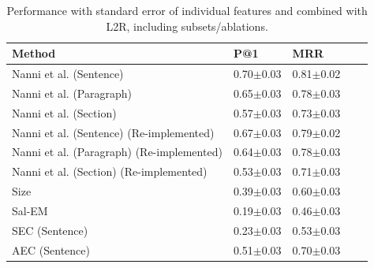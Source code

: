\begin{table}[t]
    \caption{Performance with standard error of individual features and combined with L2R, including subsets/ablations.}
    \label{tab:Results}
    \begin{tabular}{@{}lllll@{}}
        \toprule
        Method & 
       P@1 &
        MRR \\ 
        
        \midrule
        
         Nanni et al. (Sentence) \cite{nanni2018entity}&  
      0.70$\pm$0.03&
      0.81$\pm$0.02
      \\
      
      
    
      Nanni et al. (Paragraph) \cite{nanni2018entity}&  
      0.65$\pm$0.03&
      0.78$\pm$0.03
      \\
      
      Nanni et al. (Section) \cite{nanni2018entity}&  
      0.57$\pm$0.03&
      0.73$\pm$0.03
      \\
      
      \midrule
        
     
      
     
      Nanni et al. (Sentence) (Re-implemented)&  
      0.67$\pm$0.03&
      0.79$\pm$0.02
      \\
      
      
    
      Nanni et al. (Paragraph) (Re-implemented)&  
      0.64$\pm$0.03&
      0.78$\pm$0.03
      \\
      
      Nanni et al. (Section) (Re-implemented)&  
      0.53$\pm$0.03&
      0.71$\pm$0.03
      \\
      
     
      Size &
      0.39$\pm$0.03&
      0.60$\pm$0.03
      \\
      
      \midrule
      
     
    Sal-EM   &   
      0.19$\pm$0.03 &
      0.46$\pm$0.03
      \\
      
      
      
      SEC (Sentence)  &    
      0.23$\pm$0.03 &
      0.53$\pm$0.03
      \\
      
      
      AEC (Sentence)   &    
      0.51$\pm$0.03 &
      0.70$\pm$0.03
      \\
       \midrule
      

\end{tabular}
\end{table}
